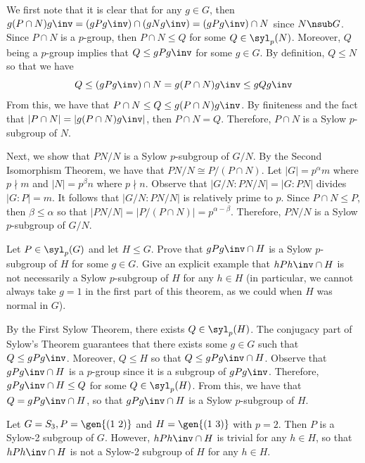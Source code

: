 \begin{sol}
	We first note that it is clear that for any $g \in G$, then $g(P \cap N)g\inv = (gPg\inv) \cap (gNg\inv) = (gPg\inv) \cap N$ since $N \nsub G$. Since $P \cap N$ is a $p$-group, then $P \cap N \leq Q$ for some $Q \in \syl_p(N)$. Moreover, $Q$ being a $p$-group implies that $Q \leq gPg\inv$ for some $g \in G$. By definition, $Q \leq N$ so that we have
	\[Q \leq (gPg\inv) \cap N = g(P \cap N)g\inv \leq gQg\inv\]
	From this, we have that $P \cap N \leq Q \leq g(P \cap N)g\inv$. By finiteness and the fact that $|P \cap N| = |g(P \cap N)g\inv|$, then $P \cap N = Q$. Therefore, $P \cap N$ is a Sylow $p$-subgroup of $N$.

	Next, we show that $PN/N$ is a Sylow $p$-subgroup of $G/N$. By the Second Isomorphism Theorem, we have that $PN/N \cong P/(P \cap N)$. Let $|G| = p^\alpha m$ where $p \nmid m$ and $|N| = p^\beta n$ where $p \nmid n$. Observe that $|G/N : PN/N| = |G: PN|$ divides $|G : P| = m$. It follows that $|G/N : PN/N|$ is relatively prime to $p$. Since $P \cap N \leq P$, then $\beta \leq \alpha$ so that $|PN/N| = |P/(P \cap N)| = p^{\alpha - \beta}$. Therefore, $PN/N$ is a Sylow $p$-subgroup of $G/N$.
\end{sol}

\begin{exercise}\label{ex4.5.35}
	Let $P \in \syl_p(G)$ and let $H \leq G$. Prove that $gPg\inv \cap H$ is a Sylow $p$-subgroup of $H$ for some $g \in G$. Give an explicit example that $hPh\inv \cap H$ is not necessarily a Sylow $p$-subgroup of $H$ for any $h \in H$ (in particular, we cannot always take $g = 1$ in the first part of this theorem, as we could when $H$ was normal in $G$).
\end{exercise}

\begin{sol}
	By the First Sylow Theorem, there exists $Q \in \syl_p(H)$. The conjugacy part of Sylow's Theorem guarantees that there exists some $g \in G$ such that $Q \leq gPg\inv$. Moreover, $Q \leq H$ so that $Q \leq gPg\inv \cap H$. Observe that $gPg\inv \cap H$ is a $p$-group since it is a subgroup of $gPg\inv$. Therefore, $gPg\inv \cap H \leq Q$ for some $Q \in \syl_p(H)$. From this, we have that $Q = gPg\inv \cap H$, so that $gPg\inv \cap H$ is a Sylow $p$-subgroup of $H$.

	Let $G = S_3, P = \gen{(1\ 2)}$ and $H = \gen{(1\ 3)}$ with $p = 2$. Then $P$ is a Sylow-2 subgroup of $G$. However, $hPh\inv \cap H$ is trivial for any $h \in H$, so that $hPh\inv \cap H$ is not a Sylow-2 subgroup of $H$ for any $h \in H$.
\end{sol}

